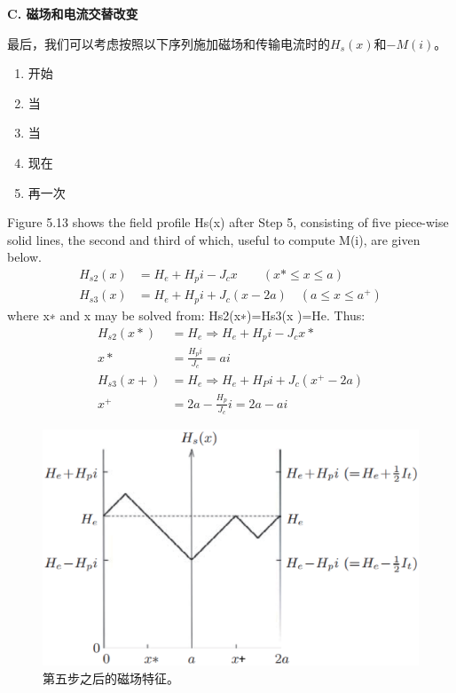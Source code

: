 \textbf{C. 磁场和电流交替改变}

最后，我们可以考虑按照以下序列施加磁场和传输电流时的$H_s(x)$和$−M(i)$。

\begin{enumerate}
	\item 开始
	\item 当
	\item 当
	\item 现在
	\item 再一次
\end{enumerate}

Figure 5.13 shows the field profile Hs(x) after Step 5, consisting of five piece-wise
solid lines, the second and third of which, useful to compute M(i), are given below.
\begin{align*}
H_{s2}(x)&=H_{e}+H_{p}i-J_{c}x\qquad(x*\leq x\leq a)\\
H_{s3}(x)&=H_{e}+H_{p}i+J_{c}(x-2a)\quad(a\leq x\leq a^{+})
\end{align*}
where x∗ and x may be solved from: Hs2(x∗)=Hs3(x )=He. Thus:
\begin{align*}
H_{s2}(x*)&=H_{e}\Rightarrow H_{e}+H_{p}i-J_{c}x*\\
x*&=\frac{H_{p}i}{J_{c}}=ai\\
H_{s3}(x+)&=H_{e}\Rightarrow H_{e}+H_{P}i+J_{c}(x^{+}-2a)\\
x^{+}&=2a-\frac{H_{p}}{J_{c}}i=2a-ai
\end{align*}

\begin{figure}[htbp]
	\centering
	\includegraphics[scale=0.5]{chpt5/figs/fig5.13.eps}
	\caption{第五步之后的磁场特征。}
\end{figure}


